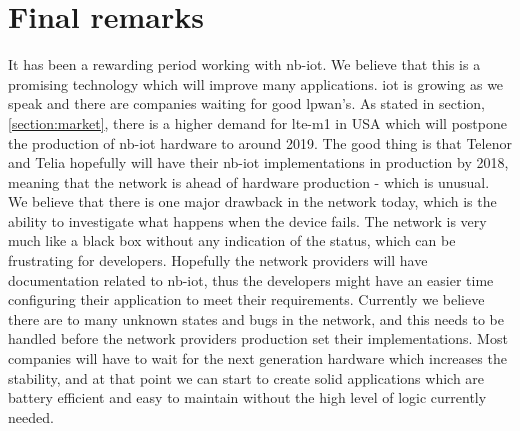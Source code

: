 \documentclass[USenglish]{ifimaster}  %
\begin{document}
\section{Final remarks}
It has been a rewarding period working with \acrshort{nb-iot}. We believe that this is a promising technology which will improve many applications. \acrshort{iot} is growing as we speak and there are companies waiting for good \acrshort{lpwan}'s. As stated in section, \vref{section:market}, there is a higher demand for \acrshort{lte-m1} in USA which will postpone the production of \acrshort{nb-iot} hardware to around 2019. The good thing is that Telenor and Telia hopefully will have their \acrshort{nb-iot} implementations in production by 2018, meaning that the network is ahead of hardware production - which is unusual. We believe that there is one major drawback in the network today, which is the ability to investigate what happens when the device fails. The network is very much like a black box without any indication of the status, which can be frustrating for developers. Hopefully the network providers will have documentation related to \acrshort{nb-iot}, thus the developers might have an easier time configuring their application to meet their requirements. Currently we believe there are to many unknown states and bugs in the network, and this needs to be handled before the network providers production set their implementations. Most companies will have to wait for the next generation hardware which increases the stability, and at that point we can start to create solid applications which are battery efficient and easy to maintain without the high level of logic currently needed.

\backmatter{}
\printbibliography
\printglossary[type=\acronymtype]
\end{document}
